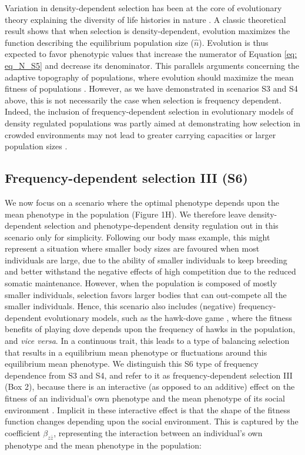 \documentclass{article}
\begin{document}
	Variation in density-dependent selection has been at the core of evolutionary theory explaining the diversity of life histories in nature \citep{Pianka1970,macarthur1967theory, Boyce1984, Mueller1991, Engen2013}. A classic theoretical result \citep{MacArthur1962, Engen2013} shows that when selection is density-dependent, evolution maximizes the function describing the equilibrium population size ($\hat{n}$). Evolution is thus expected to favor phenotypic values that increase the numerator of Equation \ref{eq: eq_N_S5} and decrease its denominator. This parallels arguments concerning the adaptive topography of populations, where evolution should maximize the mean fitness of populations \citep{Wright1931}. However, as we have demonstrated in scenarios S3 and S4 above, this is not necessarily the case when selection is frequency dependent. Indeed, the inclusion of frequency-dependent selection in evolutionary models of density regulated populations was partly aimed at demonstrating how selection in crowded environments may not lead to greater carrying capacities or larger population sizes \citep{Clarke1972, Anderson1983, Engen2020}. 
	
	\subsection{Frequency-dependent selection III (S6)}
	We now focus on a scenario where the optimal phenotype depends upon the mean phenotype in the population (Figure 1H). We therefore leave density-dependent selection and phenotype-dependent density regulation out in this scenario only for simplicity. Following our body mass example, this might represent a situation where smaller body sizes are favoured when most individuals are large, due to the ability of smaller individuals to keep breeding and better withstand the negative effects of high competition due to the reduced somatic maintenance. However, when the population is composed of mostly smaller individuals, selection favors larger bodies that can out-compete all the smaller individuals. Hence, this scenario also includes (negative) frequency-dependent evolutionary models, such as the hawk-dove game \citep{MaynardSmith1982}, where the fitness benefits of playing dove depends upon the frequency of hawks in the population, and \textit{vice versa}. In a continuous trait, this leads to a type of balancing selection that results in a equilibrium mean phenotype or fluctuations around this equilibrium mean phenotype. We distinguish this S6 type of frequency dependence from S3 and S4, and refer to it as frequency-dependent selection III (Box 2), because there is an interactive (as opposed to an additive) effect on the fitness of an individual's own phenotype and the mean phenotype of its social environment \citep{Araya-Ajoy2020}. Implicit in these interactive effect is that the shape of the fitness function changes depending upon the social environment. This is captured by the coefficient $\beta_{z\bar{z}}$, representing the interaction between an individual's own phenotype and the mean phenotype in the population:  
	
\end{document}
